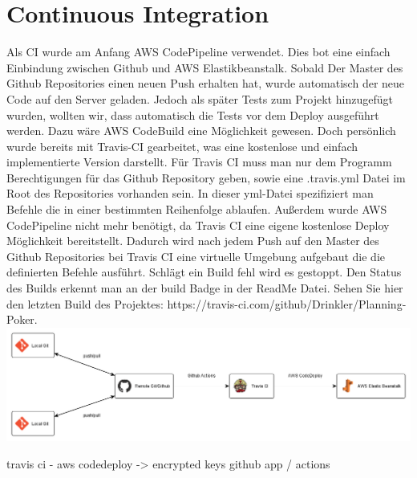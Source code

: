 \chapter{Continuous Integration}\label{ch:continuous-integration}
Als CI wurde am Anfang AWS CodePipeline verwendet. Dies bot eine einfach Einbindung zwischen Github und AWS Elastikbeanstalk. Sobald Der Master des Github Repositories einen neuen Push erhalten hat, wurde automatisch der neue Code auf den Server geladen. Jedoch als später Tests zum Projekt hinzugefügt wurden, wollten wir, dass automatisch die Tests vor dem Deploy ausgeführt werden. Dazu wäre AWS CodeBuild eine Möglichkeit gewesen. Doch persönlich wurde bereits mit Travis-CI gearbeitet, was eine kostenlose und einfach implementierte Version darstellt. Für Travis CI muss man nur dem Programm Berechtigungen für das Github Repository geben, sowie eine .travis.yml Datei im Root des Repositories vorhanden sein. In dieser yml-Datei spezifiziert man Befehle die in einer bestimmten Reihenfolge ablaufen. Außerdem wurde AWS CodePipeline nicht mehr benötigt, da Travis CI eine eigene kostenlose Deploy Möglichkeit bereitstellt.
Dadurch wird nach jedem Push auf den Master des Github Repositories bei Travis CI eine virtuelle Umgebung aufgebaut die die definierten Befehle ausführt. Schlägt ein Build fehl wird es gestoppt. Den Status des Builds erkennt man an der build Badge in der ReadMe Datei. Sehen Sie hier den letzten Build des Projektes: https://travis-ci.com/github/Drinkler/Planning-Poker.
\includegraphics[width=\textwidth]{images/continuous_integration.png}

travis ci - aws codedeploy -> encrypted keys
github app / actions